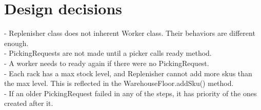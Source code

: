 \documentclass[12pt]{article}
\begin{document}
\section*{Design decisions}
- Replenisher class does not inherent Worker class. Their behaviors are different enough.\\
- PickingRequests are not made until a picker calls ready method.\\
- A worker needs to ready again if there were no PickingRequest.\\
- Each rack has a max stock level, and Replenisher cannot add more skus than the max level. This is reflected in the WarehouseFloor.addSku() method.\\
- If an older PickingRequest failed in any of the steps, it has priority of the ones created after it.
\end{document}
